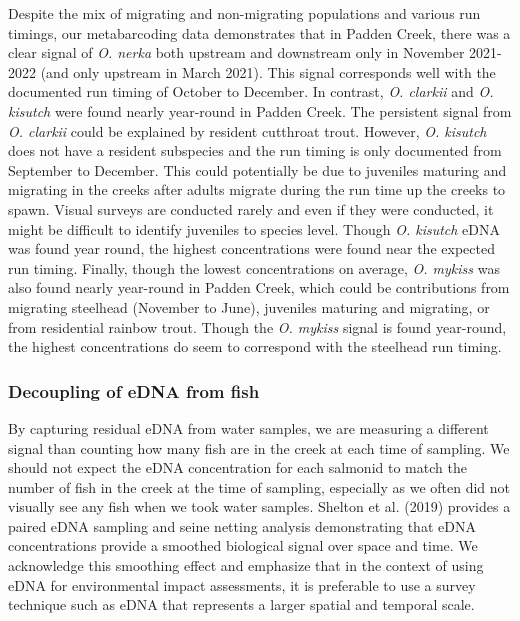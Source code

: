 \documentclass[
]{article}
\begin{document}
Despite the mix of migrating and non-migrating populations and various
run timings, our metabarcoding data demonstrates that in Padden Creek,
there was a clear signal of \emph{O. nerka} both upstream and downstream
only in November 2021-2022 (and only upstream in March 2021). This
signal corresponds well with the documented run timing of October to
December. In contrast, \emph{O. clarkii} and \emph{O. kisutch} were
found nearly year-round in Padden Creek. The persistent signal from
\emph{O. clarkii} could be explained by resident cutthroat trout.
However, \emph{O. kisutch} does not have a resident subspecies and the
run timing is only documented from September to December. This could
potentially be due to juveniles maturing and migrating in the creeks
after adults migrate during the run time up the creeks to spawn. Visual
surveys are conducted rarely and even if they were conducted, it might
be difficult to identify juveniles to species level. Though \emph{O.
kisutch} eDNA was found year round, the highest concentrations were
found near the expected run timing. Finally, though the lowest
concentrations on average, \emph{O. mykiss} was also found nearly
year-round in Padden Creek, which could be contributions from migrating
steelhead (November to June), juveniles maturing and migrating, or from
residential rainbow trout. Though the \emph{O. mykiss} signal is found
year-round, the highest concentrations do seem to correspond with the
steelhead run timing.

\hypertarget{decoupling-of-edna-from-fish}{%
\subsubsection{Decoupling of eDNA from
fish}\label{decoupling-of-edna-from-fish}}

By capturing residual eDNA from water samples, we are measuring a
different signal than counting how many fish are in the creek at each
time of sampling. We should not expect the eDNA concentration for each
salmonid to match the number of fish in the creek at the time of
sampling, especially as we often did not visually see any fish when we
took water samples. Shelton et al. (2019) provides a paired eDNA
sampling and seine netting analysis demonstrating that eDNA
concentrations provide a smoothed biological signal over space and time.
We acknowledge this smoothing effect and emphasize that in the context
of using eDNA for environmental impact assessments, it is preferable to
use a survey technique such as eDNA that represents a larger spatial and
temporal scale.
\end{document}
